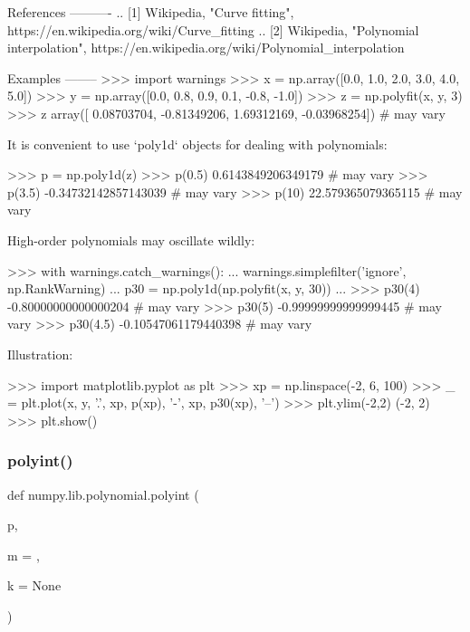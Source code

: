 \begin{DoxyVerb}
References
----------
.. [1] Wikipedia, "Curve fitting",
       https://en.wikipedia.org/wiki/Curve_fitting
.. [2] Wikipedia, "Polynomial interpolation",
       https://en.wikipedia.org/wiki/Polynomial_interpolation

Examples
--------
>>> import warnings
>>> x = np.array([0.0, 1.0, 2.0, 3.0,  4.0,  5.0])
>>> y = np.array([0.0, 0.8, 0.9, 0.1, -0.8, -1.0])
>>> z = np.polyfit(x, y, 3)
>>> z
array([ 0.08703704, -0.81349206,  1.69312169, -0.03968254]) # may vary

It is convenient to use `poly1d` objects for dealing with polynomials:

>>> p = np.poly1d(z)
>>> p(0.5)
0.6143849206349179 # may vary
>>> p(3.5)
-0.34732142857143039 # may vary
>>> p(10)
22.579365079365115 # may vary

High-order polynomials may oscillate wildly:

>>> with warnings.catch_warnings():
...     warnings.simplefilter('ignore', np.RankWarning)
...     p30 = np.poly1d(np.polyfit(x, y, 30))
...
>>> p30(4)
-0.80000000000000204 # may vary
>>> p30(5)
-0.99999999999999445 # may vary
>>> p30(4.5)
-0.10547061179440398 # may vary

Illustration:

>>> import matplotlib.pyplot as plt
>>> xp = np.linspace(-2, 6, 100)
>>> _ = plt.plot(x, y, '.', xp, p(xp), '-', xp, p30(xp), '--')
>>> plt.ylim(-2,2)
(-2, 2)
>>> plt.show()\end{DoxyVerb}
 \mbox{\label{namespacenumpy_1_1lib_1_1polynomial_aab48ef7d0433f083a59e67879dd843be}} 
\subsubsection{\texorpdfstring{polyint()}{polyint()}}
{\footnotesize\ttfamily def numpy.\+lib.\+polynomial.\+polyint (\begin{DoxyParamCaption}\item[{}]{p,  }\item[{}]{m = {},  }\item[{}]{k = {\ttfamily None} }\end{DoxyParamCaption})}

